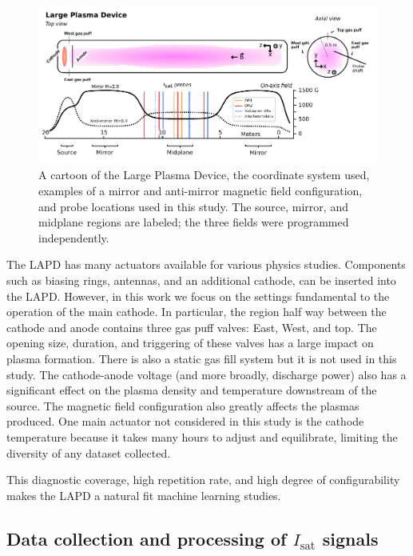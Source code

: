 \begin{figure}
	\centering
	\includegraphics[width=\textwidth]{figures/LAPD+coordinates.pdf}
	\caption[size=12]{\label{fig:LAPD_coords}A cartoon of the Large Plasma Device, the coordinate system used, examples of a mirror and anti-mirror magnetic field configuration, and probe locations used in this study. The source, mirror, and midplane regions are labeled; the three fields were programmed independently.}
\end{figure}

The LAPD has many actuators available for various physics studies. Components such as biasing rings, antennas, and an additional cathode, can be inserted into the LAPD. However, in this work we focus on the settings fundamental to the operation of the main cathode. In particular, the region half way between the cathode and anode contains three gas puff valves: East, West, and top. The opening size, duration, and triggering of these valves has a large impact on plasma formation. There is also a static gas fill system but it is not used in this study. The cathode-anode voltage (and more broadly, discharge power) also has a significant effect on the plasma density and temperature downstream of the source. The magnetic field configuration also greatly affects the plasmas produced. One main actuator not considered in this study is the cathode temperature because it takes many hours to adjust and equilibrate, limiting the diversity of any dataset collected.

This diagnostic coverage, high repetition rate, and high degree of configurability makes the LAPD a natural fit machine learning studies. 

\subsection{Data collection and processing of $I_\text{sat}$ signals}

